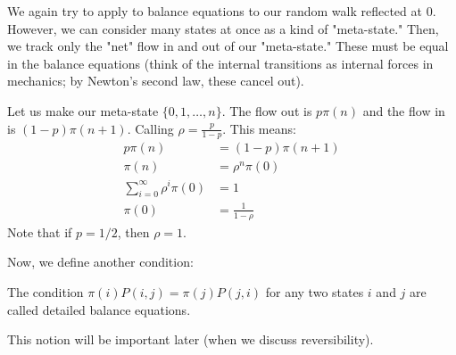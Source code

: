 We again try to apply to balance equations to our random walk reflected at 0. However,
we can consider many states at once as a kind of "meta-state." Then, we track only the "net" flow in and out
of our "meta-state." These must be equal in the balance equations (think of the internal transitions as internal forces in mechanics;
by Newton's second law, these cancel out).

Let us make our meta-state $\{0, 1, \dots, n\}$. The flow out is $p \pi(n)$ and the flow in is $(1- p) \pi(n + 1)$. Calling
$\rho = \frac{p}{1-p}$. This means:
\begin{align*}
    p \pi(n) &= (1 - p) \pi(n + 1) \\
    \pi(n) &= \rho^n \pi(0) \\
    \sum_{i = 0}^{\infty} \rho^i \pi(0) &= 1 \\
    \pi(0) &= \frac{1}{1 - \rho}
\end{align*}
Note that if $p = 1/2$, then $\rho = 1$.

Now, we define another condition:

\begin{definition}
    The condition $\pi(i) P(i, j) = \pi(j) P(j, i)$ for any two
    states $i$ and $j$ are called detailed balance equations.
\end{definition}

This notion will be important later (when we discuss reversibility).
